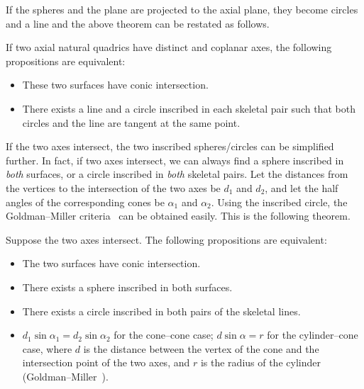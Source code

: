      If the spheres and the plane are projected to the axial plane, they become
circles and a line and the above theorem can be restated as follows.

\begin{corollary}
     If two axial natural quadrics have distinct and coplanar axes,  the
following propositions are equivalent:
\begin{itemize}
     \item These two surfaces have conic intersection.
     \item There exists a line and a circle inscribed in each skeletal pair
          such that both circles and the line are tangent at the same point.
\end{itemize}
\end{corollary}

     If the two axes intersect, the two inscribed spheres/circles can be 
simplified further. In fact, if two axes intersect, we can always find a 
sphere inscribed in {\em both} surfaces, or a circle inscribed in {\em both} 
skeletal pairs.  Let the distances from the vertices to the intersection of 
the two axes be $d_1$ and $d_2$, and let the half angles of the corresponding 
cones be $\alpha_1$ and $\alpha_2$.  Using the inscribed circle, the 
Goldman--Miller criteria~\cite{goldman:1990} can be obtained easily.  
This is the following theorem.

\begin{theorem}
\label{theorem:intersecting-axes-characterization}
     Suppose the two axes intersect.  The following propositions are
equivalent:
\begin{itemize}
     \item The two surfaces have conic intersection.
     \item There exists a sphere inscribed in both surfaces.
     \item There exists a circle inscribed in both pairs of the skeletal lines.
     \item $d_1\sin\alpha_1=d_2\sin\alpha_2$ for the cone--cone case;
           $d\sin\alpha=r$ for the cylinder--cone case, where $d$ is the 
           distance between the vertex of the cone and the intersection point
           of the two axes, and $r$ is the radius of the cylinder
           (Goldman--Miller~\cite{goldman:1990}).
\end{itemize}
\end{theorem}


